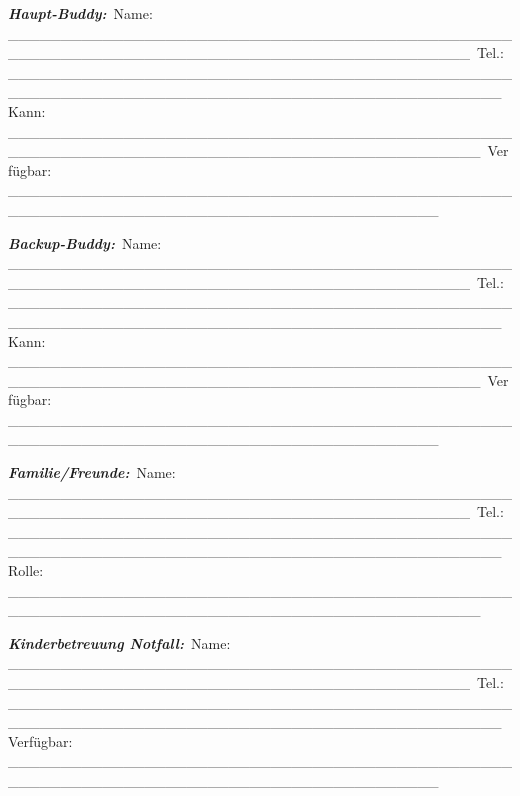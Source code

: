 \emph{\textbf{Haupt-Buddy:}}\
Name: \_\_\_\_\_\_\_\_\_\_\_\_\_\_\_\_\_\_\_\_\_\_\_\_\_\_\_\_\_\_\_\_\_\_\_\_\_\_\_\_\_\_\_\_\_\_\_\_\_\_\_\_\_\_\_\_\_\_\_\_\_\_\_\_\_\_\_\_\_\_\_\_\_\_\_\_\_\_\_\_\_\_\_\_\_\_\_\_\_\_\_\_\
Tel.: \_\_\_\_\_\_\_\_\_\_\_\_\_\_\_\_\_\_\_\_\_\_\_\_\_\_\_\_\_\_\_\_\_\_\_\_\_\_\_\_\_\_\_\_\_\_\_\_\_\_\_\_\_\_\_\_\_\_\_\_\_\_\_\_\_\_\_\_\_\_\_\_\_\_\_\_\_\_\_\_\_\_\_\_\_\_\_\_\_\_\_\_\_\_\_\
Kann: \_\_\_\_\_\_\_\_\_\_\_\_\_\_\_\_\_\_\_\_\_\_\_\_\_\_\_\_\_\_\_\_\_\_\_\_\_\_\_\_\_\_\_\_\_\_\_\_\_\_\_\_\_\_\_\_\_\_\_\_\_\_\_\_\_\_\_\_\_\_\_\_\_\_\_\_\_\_\_\_\_\_\_\_\_\_\_\_\_\_\_\_\_\
Verfügbar: \_\_\_\_\_\_\_\_\_\_\_\_\_\_\_\_\_\_\_\_\_\_\_\_\_\_\_\_\_\_\_\_\_\_\_\_\_\_\_\_\_\_\_\_\_\_\_\_\_\_\_\_\_\_\_\_\_\_\_\_\_\_\_\_\_\_\_\_\_\_\_\_\_\_\_\_\_\_\_\_\_\_\_\_\_\_\_\_\_

\emph{\textbf{Backup-Buddy:}}\
Name: \_\_\_\_\_\_\_\_\_\_\_\_\_\_\_\_\_\_\_\_\_\_\_\_\_\_\_\_\_\_\_\_\_\_\_\_\_\_\_\_\_\_\_\_\_\_\_\_\_\_\_\_\_\_\_\_\_\_\_\_\_\_\_\_\_\_\_\_\_\_\_\_\_\_\_\_\_\_\_\_\_\_\_\_\_\_\_\_\_\_\_\_\
Tel.: \_\_\_\_\_\_\_\_\_\_\_\_\_\_\_\_\_\_\_\_\_\_\_\_\_\_\_\_\_\_\_\_\_\_\_\_\_\_\_\_\_\_\_\_\_\_\_\_\_\_\_\_\_\_\_\_\_\_\_\_\_\_\_\_\_\_\_\_\_\_\_\_\_\_\_\_\_\_\_\_\_\_\_\_\_\_\_\_\_\_\_\_\_\_\_\
Kann: \_\_\_\_\_\_\_\_\_\_\_\_\_\_\_\_\_\_\_\_\_\_\_\_\_\_\_\_\_\_\_\_\_\_\_\_\_\_\_\_\_\_\_\_\_\_\_\_\_\_\_\_\_\_\_\_\_\_\_\_\_\_\_\_\_\_\_\_\_\_\_\_\_\_\_\_\_\_\_\_\_\_\_\_\_\_\_\_\_\_\_\_\_\
Verfügbar: \_\_\_\_\_\_\_\_\_\_\_\_\_\_\_\_\_\_\_\_\_\_\_\_\_\_\_\_\_\_\_\_\_\_\_\_\_\_\_\_\_\_\_\_\_\_\_\_\_\_\_\_\_\_\_\_\_\_\_\_\_\_\_\_\_\_\_\_\_\_\_\_\_\_\_\_\_\_\_\_\_\_\_\_\_\_\_\_\_

\emph{\textbf{Familie/Freunde:}}\
Name: \_\_\_\_\_\_\_\_\_\_\_\_\_\_\_\_\_\_\_\_\_\_\_\_\_\_\_\_\_\_\_\_\_\_\_\_\_\_\_\_\_\_\_\_\_\_\_\_\_\_\_\_\_\_\_\_\_\_\_\_\_\_\_\_\_\_\_\_\_\_\_\_\_\_\_\_\_\_\_\_\_\_\_\_\_\_\_\_\_\_\_\_\
Tel.: \_\_\_\_\_\_\_\_\_\_\_\_\_\_\_\_\_\_\_\_\_\_\_\_\_\_\_\_\_\_\_\_\_\_\_\_\_\_\_\_\_\_\_\_\_\_\_\_\_\_\_\_\_\_\_\_\_\_\_\_\_\_\_\_\_\_\_\_\_\_\_\_\_\_\_\_\_\_\_\_\_\_\_\_\_\_\_\_\_\_\_\_\_\_\_\
Rolle: \_\_\_\_\_\_\_\_\_\_\_\_\_\_\_\_\_\_\_\_\_\_\_\_\_\_\_\_\_\_\_\_\_\_\_\_\_\_\_\_\_\_\_\_\_\_\_\_\_\_\_\_\_\_\_\_\_\_\_\_\_\_\_\_\_\_\_\_\_\_\_\_\_\_\_\_\_\_\_\_\_\_\_\_\_\_\_\_\_\_\_\_\_

\emph{\textbf{Kinderbetreuung Notfall:}}\
Name: \_\_\_\_\_\_\_\_\_\_\_\_\_\_\_\_\_\_\_\_\_\_\_\_\_\_\_\_\_\_\_\_\_\_\_\_\_\_\_\_\_\_\_\_\_\_\_\_\_\_\_\_\_\_\_\_\_\_\_\_\_\_\_\_\_\_\_\_\_\_\_\_\_\_\_\_\_\_\_\_\_\_\_\_\_\_\_\_\_\_\_\_\
Tel.: \_\_\_\_\_\_\_\_\_\_\_\_\_\_\_\_\_\_\_\_\_\_\_\_\_\_\_\_\_\_\_\_\_\_\_\_\_\_\_\_\_\_\_\_\_\_\_\_\_\_\_\_\_\_\_\_\_\_\_\_\_\_\_\_\_\_\_\_\_\_\_\_\_\_\_\_\_\_\_\_\_\_\_\_\_\_\_\_\_\_\_\_\_\_\_\
Verfügbar: \_\_\_\_\_\_\_\_\_\_\_\_\_\_\_\_\_\_\_\_\_\_\_\_\_\_\_\_\_\_\_\_\_\_\_\_\_\_\_\_\_\_\_\_\_\_\_\_\_\_\_\_\_\_\_\_\_\_\_\_\_\_\_\_\_\_\_\_\_\_\_\_\_\_\_\_\_\_\_\_\_\_\_\_\_\_\_\_\_

